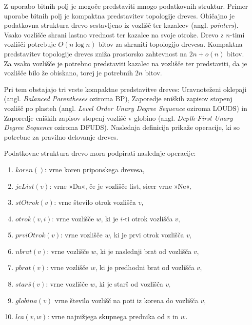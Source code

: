Z uporabo bitnih polj je mogoče predstaviti mnogo podatkovnih struktur. Primer uporabe bitnih polj je kompaktna predstavitev topologije dreves. Običajno je podatkovna struktura drevo sestavljeno iz vozlišč ter kazalcev (angl. \textit{pointers}). Vsako vozlišče shrani lastno vrednost ter kazalce na svoje otroke. Drevo z $n$-timi vozlišči potrebuje $O(n\log{n})$ bitov za shraniti topologijo drevesa. Kompaktna predstavitev topologije dreves zniža prostorsko zahtevnost na $2n+o(n)$ bitov. Za vsako vozlišče je potrebno predstaviti kazalec na vozlišče ter predstaviti, da je vozlišče bilo že obiskano, torej je potrebnih $2n$ bitov.

Pri tem obstajajo tri vrste kompaktne predstavitve dreves: Uravnoteženi oklepaji (angl. \textit{Balanced Parentheses} oziroma BP), Zaporedje eniških zapisov stopenj vozlišč po plasteh (angl. \textit{Level Order Unary Degree Sequence} oziroma LOUDS) in Zaporedje eniških zapisov stopenj vozlišč v globino (angl. \textit{Depth-First Unary Degree Sequence} oziroma DFUDS).
Naslednja definicija prikaže operacije, ki so potrebne za pravilno delovanje dreves.

\begin{defi}\label{def:drevo}
    Podatkovne struktura drevo mora podpirati naslednje operacije:
    \begin{enumerate}
        \item $koren()$: vrne koren priponskega drevesa,
        \item $jeList(v)$: vrne »Da«, če je vozlišče list, sicer vrne »Ne«,
        \item $stOtrok(v)$: vrne število otrok vozlišča $v$,
        \item $otrok(v,i)$: vrne vozlišče $w$, ki je $i$-ti otrok vozlišča $v$,
        \item $prviOtrok(v)$: vrne vozlišče $w$, ki je prvi otrok vozlišča $v$,
        \item $nbrat(v)$: vrne vozlišče $w$, ki je naslednji brat od vozlišča $v$,
        \item $pbrat(v)$: vrne vozlišče $w$, ki je predhodni brat od vozlišča $v$,
        \item $star$\textit{š}$(v)$: vrne vozlišče $w$, ki je starš od vozlišča $v$,
        \item $globina(v)$ vrne število vozlišč na poti iz korena do vozlišča $v$,
        \item $lca(v,w)$: vrne najnižjega skupnega prednika od $v$ in $w$.
    \end{enumerate}
\end{defi}

